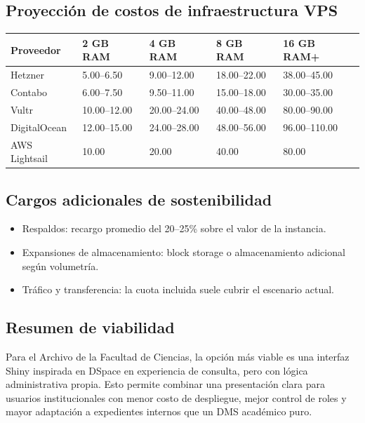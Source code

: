 \subsection{Proyección de costos de infraestructura VPS}
\begin{longtable}{p{} p{} p{} p{} p{}}
\toprule
\textbf{Proveedor} & \textbf{2 GB RAM} & \textbf{4 GB RAM} & \textbf{8 GB RAM} & \textbf{16 GB RAM+} \\
\midrule
Hetzner & 5.00--6.50 & 9.00--12.00 & 18.00--22.00 & 38.00--45.00 \\
Contabo & 6.00--7.50 & 9.50--11.00 & 15.00--18.00 & 30.00--35.00 \\
Vultr & 10.00--12.00 & 20.00--24.00 & 40.00--48.00 & 80.00--90.00 \\
DigitalOcean & 12.00--15.00 & 24.00--28.00 & 48.00--56.00 & 96.00--110.00 \\
AWS Lightsail & 10.00 & 20.00 & 40.00 & 80.00 \\
\bottomrule
\end{longtable}

\subsection{Cargos adicionales de sostenibilidad}
\begin{itemize}
  \item Respaldos: recargo promedio del 20--25\% sobre el valor de la instancia.
  \item Expansiones de almacenamiento: block storage o almacenamiento adicional según volumetría.
  \item Tráfico y transferencia: la cuota incluida suele cubrir el escenario actual.
\end{itemize}

\subsection{Resumen de viabilidad}
Para el Archivo de la Facultad de Ciencias, la opción más viable es una interfaz Shiny inspirada en DSpace en experiencia de consulta, pero con lógica administrativa propia. Esto permite combinar una presentación clara para usuarios institucionales con menor costo de despliegue, mejor control de roles y mayor adaptación a expedientes internos que un DMS académico puro.